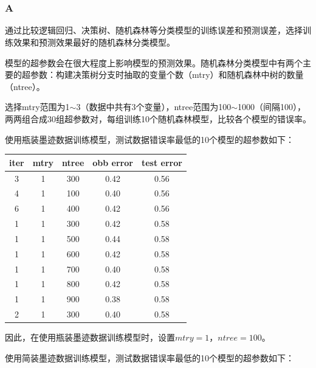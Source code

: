 \documentclass[12pt,a4paper]{article}
\begin{document}
    \section{}
    \subsubsection*{A}
    通过比较逻辑回归、决策树、随机森林等分类模型的训练误差和预测误差，选择训练效果和预测效果最好的随机森林分类模型。\par
    模型的超参数会在很大程度上影响模型的预测效果。随机森林分类模型中有两个主要的超参数：构建决策树分支时抽取的变量个数（mtry）和随机森林中树的数量（ntree）。\par
    选择mtry范围为1$\sim$3（数据中共有3个变量），ntree范围为100$\sim$1000（间隔100），两两组合成30组超参数对，每组训练10个随机森林模型，比较各个模型的错误率。\par
    使用瓶装墨迹数据训练模型，测试数据错误率最低的10个模型的超参数如下：
    \begin{longtable}{c|c|c|c|c}
        \hline
        \textbf{iter} & \textbf{mtry} & \textbf{ntree} & \textbf{obb error} & \textbf{test error}\\
        \hline
        3 & 1 & 300 & 0.42 & 0.56\\
        \hline
        4 & 1 & 100 & 0.40 & 0.56\\
        \hline
        6 & 1 & 400 & 0.42 & 0.56\\
        \hline
        1 & 1 & 300 & 0.42 & 0.58\\
        \hline
        1 & 1 & 500 & 0.44 & 0.58\\
        \hline
        1 & 1 & 600 & 0.42 & 0.58\\
        \hline
        1 & 1 & 700 & 0.40 & 0.58\\
        \hline
        1 & 1 & 800 & 0.42 & 0.58\\
        \hline
        1 & 1 & 900 & 0.38 & 0.58\\
        \hline
        2 & 1 & 300 & 0.40 & 0.58\\
        \hline
    \end{longtable}
    因此，在使用瓶装墨迹数据训练模型时，设置$mtry=1$，$ntree=100$。\par
    使用简装墨迹数据训练模型，测试数据错误率最低的10个模型的超参数如下：
\end{document}
